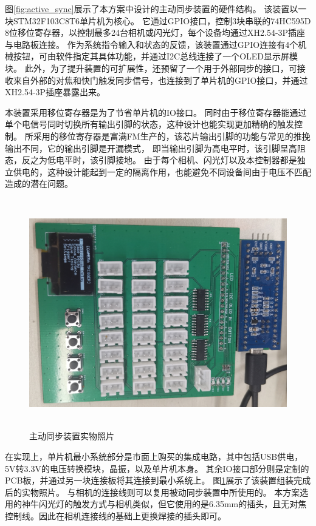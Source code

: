 图\ref{fig:active_sync}展示了本方案中设计的主动同步装置的硬件结构。
该装置以一块STM32F103C8T6单片机为核心。
它通过GPIO接口，控制3块串联的74HC595D 8位移位寄存器，以控制最多24台相机或闪光灯，每个设备均通过XH2.54-3P插座与电路板连接。
作为系统指令输入和状态的反馈，该装置通过GPIO连接有4个机械按钮，可由软件指定其具体功能，并通过I2C总线连接了一个OLED显示屏模块。
此外，为了提升装置的可扩展性，还预留了一个用于外部同步的接口，可接收来自外部的对焦和快门触发同步信号，也连接到了单片机的GPIO接口，并通过XH2.54-3P插座暴露出来。

本装置采用移位寄存器是为了节省单片机的IO接口。
同时由于移位寄存器能通过单个电信号同时切换所有输出引脚的状态，这种设计也能实现更加精确的触发控制。
所采用的移位寄存器是富满FM生产的，该芯片输出引脚的功能与常见的推挽输出不同，它的输出引脚是开漏模式，
即当输出引脚为高电平时，该引脚呈高阻态，反之为低电平时，该引脚接地。
由于每个相机、闪光灯以及本控制器都是独立供电的，这种设计能起到一定的隔离作用，也能避免不同设备间由于电压不匹配造成的潜在问题。

\begin{figure}
\centering
\includegraphics[height=10cm]{figures/active_sync_photo.jpg}
\caption{主动同步装置实物照片}
\label{fig:active_sync_photo}
\end{figure}

在实现上，单片机最小系统部分是市面上购买的集成电路，其中包括USB供电，5V转3.3V的电压转换模块，晶振，以及单片机本身。
其余IO接口部分则是定制的PCB板，并通过另一块连接板将其连接到最小系统上。
图\ref{fig:active_sync_photo}展示了该装置组装完成后的实物照片。
与相机的连接线则可以复用被动同步装置中所使用的。
本方案选用的神牛闪光灯的触发方式与相机类似，但它使用的是6.35mm的插头，且无对焦控制线。因此在相机连接线的基础上更换焊接的插头即可。

